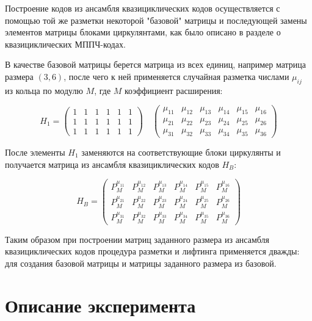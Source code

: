 Построение кодов из ансамбля квазициклических кодов осуществляется с помощью той же разметки
некоторой "базовой" матрицы и последующей замены элементов матрицы блоками циркулянтами, как было
описано в разделе о квазициклических МППЧ-кодах.

В качестве базовой матрицы берется матрица из всех единиц, например матрица размера $(3,6)$,
после чего к ней применяется случайная разметка числами $\mu_{ij}$ из кольца по модулю $M$,
 где $M$ коэффициент
расширения:

\[
	H_1 = \begin{pmatrix}
		1 & 1 & 1 & 1 & 1 & 1 \\
		1 & 1 & 1 & 1 & 1 & 1 \\
		1 & 1 & 1 & 1 & 1 & 1
	\end{pmatrix}
	\quad
	\begin{pmatrix}
		\mu_{11} & \mu_{12} & \mu_{13} & \mu_{14} & \mu_{15} & \mu_{16} \\
		\mu_{21} & \mu_{22} & \mu_{23} & \mu_{24} & \mu_{25} & \mu_{26} \\
		\mu_{31} & \mu_{32} & \mu_{33} & \mu_{34} & \mu_{35} & \mu_{36}
	\end{pmatrix}
\]

После элементы $H_1$ заменяются на соответствующие блоки циркулянты и получается матрица из ансамбля
квазициклических кодов $H_B$:

\[
H_B=\begin{pmatrix}
		P^{\mu_{11}}_M & P^{\mu_{12}}_M & P^{\mu_{13}}_M & P^{\mu_{14}}_M & P^{\mu_{15}}_M & P^{\mu_{16}}_M \\
		P^{\mu_{21}}_M & P^{\mu_{22}}_M & P^{\mu_{23}}_M & P^{\mu_{24}}_M & P^{\mu_{25}}_M & P^{\mu_{26}}_M \\
		P^{\mu_{31}}_M & P^{\mu_{32}}_M & P^{\mu_{33}}_M & P^{\mu_{34}}_M & P^{\mu_{35}}_M & P^{\mu_{36}}_M
	\end{pmatrix}
\]

Таким образом при построении матриц заданного размера из ансамбля квазициклических кодов 
процедура разметки и лифтинга
применяется дважды: для создания базовой матрицы и матрицы заданного размера из базовой.

\section{Описание эксперимента}

\newcommand{\plotstandard}[2]{
\centerline{\texttt{[image: \#1]}}
\captionof{figure}{#2}
}
\newcommand{\plotsmall}[1]{\texttt{[image: \#1]}}

